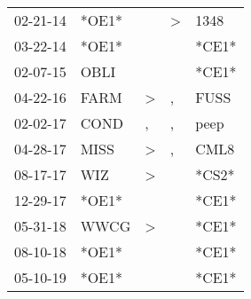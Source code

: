 \begin{supertabular}{p{0.07\textwidth}p{0.06\textwidth}p{0.02\textwidth}p{0.02\textwidth}p{0.06\textwidth}}
 02-21-14\textsuperscript{} &                   *OE1* &                  &  \textgreater &  1348\textsuperscript{} \\
 03-22-14\textsuperscript{} &                   *OE1* &                  &               &                   *CE1* \\
 02-07-15\textsuperscript{} &  OBLI\textsuperscript{} &                  &               &                   *CE1* \\
 04-22-16\textsuperscript{} &  FARM\textsuperscript{} &     \textgreater &             , &  FUSS\textsuperscript{} \\
 02-02-17\textsuperscript{} &  COND\textsuperscript{} &                , &             , &  peep\textsuperscript{} \\
 04-28-17\textsuperscript{} &  MISS\textsuperscript{} &     \textgreater &             , &  CML8\textsuperscript{} \\
 08-17-17\textsuperscript{} &   WIZ\textsuperscript{} &     \textgreater &               &                   *CS2* \\
 12-29-17\textsuperscript{} &                   *OE1* &                  &               &                   *CE1* \\
 05-31-18\textsuperscript{} &  WWCG\textsuperscript{} &     \textgreater &               &                   *CE1* \\
 08-10-18\textsuperscript{} &                   *OE1* &                  &               &                   *CE1* \\
 05-10-19\textsuperscript{} &                   *OE1* &                  &               &                   *CE1* \\
\end{supertabular}
